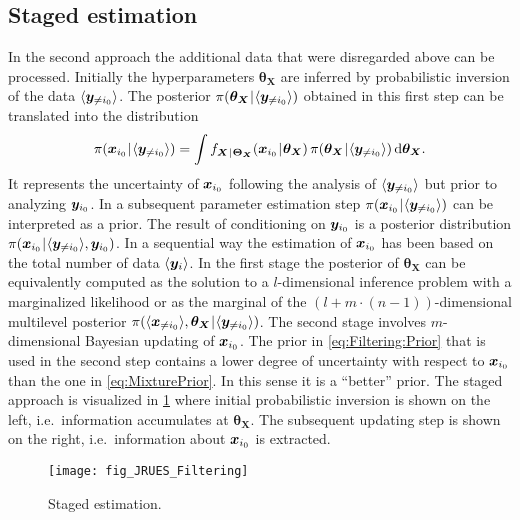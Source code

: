 \subsection{Staged estimation} \label{sec:Combination:Filtering}
In the second approach the additional data that were disregarded above can be processed.
Initially the hyperparameters \(\bm{\theta}_{\bm{X}}\) are inferred by probabilistic inversion of the data \(\langle{\bm{y}_{\neq i_0}}\rangle\).
The posterior \(\pi(\bm{\theta}_{\bm{X}} {\:\!}|{\:\!} \langle{\bm{y}_{\neq i_0}}\rangle)\) obtained in this first step can be translated into the distribution
\begin{equation} \label{eq:Filtering:Prior}
  \pi(\bm{x}_{\analyzed} \cond \tuple{\bm{y}_{\notanalyzed}})
  = \int f_{\bm{X} \cond \bm{\Theta}_{\bm{X}}}(\bm{x}_{\analyzed} \cond \bm{\theta}_{\bm{X}}) \, \pi(\bm{\theta}_{\bm{X}} \cond \tuple{\bm{y}_{\notanalyzed}}) \, \mathrm{d} \bm{\theta}_{\bm{X}}.
\end{equation}
It represents the uncertainty of \(\bm{x}_{i_0}\) following the analysis of \(\langle{\bm{y}_{\neq i_0}}\rangle\) but prior to analyzing \(\bm{y}_{i_0}\).
In a subsequent parameter estimation step \(\pi(\bm{x}_{i_0} {\:\!}|{\:\!} \langle{\bm{y}_{\neq i_0}}\rangle) \) can be interpreted as a prior.
The result of conditioning on \(\bm{y}_{i_0}\) is a posterior distribution \(\pi(\bm{x}_{i_0} {\:\!}|{\:\!} \langle{\bm{y}_{\neq i_0}}\rangle,\bm{y}_{i_0})\).
In a sequential way the estimation of \(\bm{x}_{i_0}\) has been based on the total number of data \(\langle{\bm{y}_i}\rangle\).
In the first stage the posterior of \(\bm{\theta}_{\bm{X}}\) can be equivalently  computed as the solution to a \(l\)-dimensional inference problem with a marginalized likelihood
or as the marginal of the \((l + m \cdot (n-1))\)-dimensional multilevel posterior \(\pi(\langle{\bm{x}_{\neq i_0}}\rangle,\bm{\theta}_{\bm{X}} {\:\!}|{\:\!} \langle{\bm{y}_{\neq i_0}}\rangle)\).
The second stage involves \(m\)-dimensional Bayesian updating of \(\bm{x}_{i_0}\).
The prior in \cref{eq:Filtering:Prior} that is used in the second step contains a lower degree of uncertainty with respect to \(\bm{x}_{i_0}\) than the one in \cref{eq:MixturePrior}.
In this sense it is a ``better'' prior.
The staged approach is visualized in \cref{fig:SequentialFiltering} where initial probabilistic inversion is shown on the left, i.e.\ information accumulates at \(\bm{\theta}_{\bm{X}}\).
The subsequent updating step is shown on the right, i.e.\ information about \(\bm{x}_{i_0}\) is extracted.
\begin{figure}[ht]
  \centering
  \texttt{[image: fig\_JRUES\_Filtering]}
  \caption[Staged estimation]{Staged estimation.}
  \label{fig:SequentialFiltering}
\end{figure}

